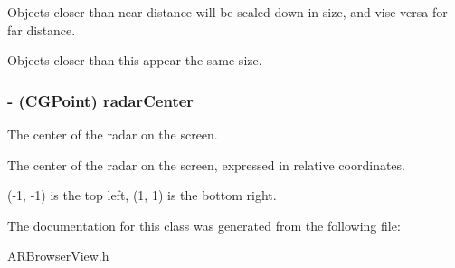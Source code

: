 Objects closer than near distance will be scaled down in size, and vise versa for far distance. 

Objects closer than this appear the same size.\hypertarget{interface_a_r_browser_view_ab390eeb9f2a9ce554dbbea33227cb389}{
\subsubsection[{radar\-Center}]{\setlength{\rightskip}{0pt plus 5cm}-\/ (C\-G\-Point) {\bf radar\-Center}}}\label{interface_a_r_browser_view_ab390eeb9f2a9ce554dbbea33227cb389}


The center of the radar on the screen. 

The center of the radar on the screen, expressed in relative coordinates.

(-\/1, -\/1) is the top left, (1, 1) is the bottom right. 

The documentation for this class was generated from the following file\-:\begin{DoxyCompactItemize}
\item 
A\-R\-Browser\-View.\-h\end{DoxyCompactItemize}
